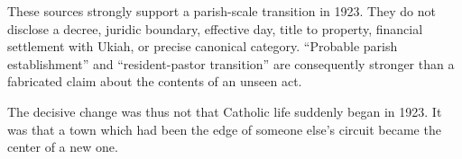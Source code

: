 These sources strongly support a parish-scale transition in 1923. They do not disclose a decree, juridic boundary, effective day, title to property, financial settlement with Ukiah, or precise canonical category. ``Probable parish establishment'' and ``resident-pastor transition'' are consequently stronger than a fabricated claim about the contents of an unseen act.


The decisive change was thus not that Catholic life suddenly began in 1923. It was that a town which had been the edge of someone else's circuit became the center of a new one.
